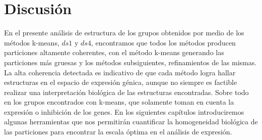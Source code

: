\section{Discusión}
En el presente análisis de estructura de los grupos obtenidos por medio de los métodos k-means, $ds1$ y $ds4$, encontramos que todos los métodos producen particiones altamente coherentes, con el método k-means generando las particiones más gruesas y los métodos subsiguientes, refinamientos de las mismas. La alta coherencia detectada es indicativo de que cada método logra  hallar estructuras en el espacio de expresión génica, aunque no siempre es factible realizar una interpretación biológica de las estructuras encontradas. Sobre todo en los grupos encontrados con k-means, que solamente toman en cuenta la expresión o inhibición de los genes. En los siguientes capítulos introduciremos algunas herramientas que nos permitirán cuantificar la homogeneidad biológica de las particiones para encontrar la escala óptima en el análisis de expresión.